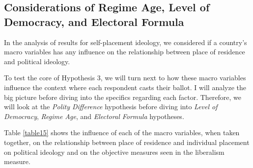 \documentclass[12pt, titlepage]{article}
\newcommand\e{\emph}
\begin{document}
\subsection{Considerations of Regime Age, Level of Democracy, and Electoral Formula}

In the analysis of results for self-placement ideology, we considered if a country's macro variables has any influence on the relationship between place of residence and political ideology.

To test the core of Hypothesis 3, we will turn next to how these macro variables influence the context where each respondent casts their ballot. I will analyze the big picture before diving into the specifics regarding each factor. Therefore, we will look at the \e{Polity Difference} hypothesis before diving into \e{Level of Democracy}, \e{Regime Age}, and \e{Electoral Formula} hypotheses.

Table \ref{table15} shows the influence of each of the macro variables, when taken together, on the relationship between place of residence and individual placement on political ideology and on the objective measures seen in the liberalism measure.
\end{document}
